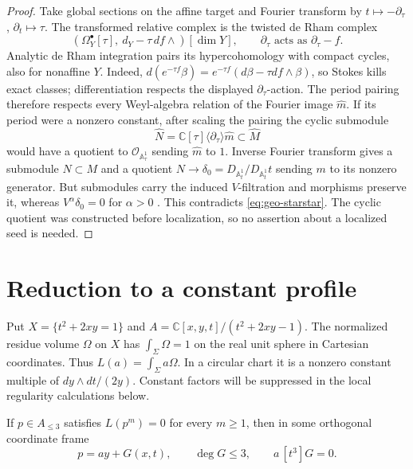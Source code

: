 \begin{proof}
Take global sections on the affine target and Fourier transform by
\(t\mapsto-\partial_\tau\), \(\partial_t\mapsto\tau\).
The transformed relative complex is the twisted de Rham complex
\[
 (\Omega_Y^\bullet[\tau],\ d_Y-\tau\,df\wedge)[\dim Y],
 \qquad \partial_\tau\text{ acts as }\partial_\tau-f.
\]
Analytic de Rham integration pairs its hypercohomology with compact
cycles, also for nonaffine \(Y\). Indeed,
\(d(e^{-\tau f}\beta)=e^{-\tau f}(d\beta-\tau df\wedge\beta)\),
so Stokes kills exact classes; differentiation respects the displayed
\(\partial_\tau\)-action. The period pairing therefore respects every
Weyl-algebra relation of the Fourier image \(\widehat m\).
If its period were a nonzero constant, after scaling the pairing the
cyclic submodule
\[
 \widehat N=\mathbb C[\tau]\langle\partial_\tau\rangle\widehat m
 \subset\widehat M
\]
would have a quotient to \(\mathcal O_{\mathbb A^1_\tau}\) sending
\(\widehat m\) to \(1\).
Inverse Fourier transform gives a submodule \(N\subset M\) and a
quotient \(N\to\delta_0=D_{\mathbb A^1_t}/D_{\mathbb A^1_t}t\)
sending \(m\) to its nonzero generator.
But submodules carry the induced \(V\)-filtration and morphisms
preserve it, whereas \(V^\alpha\delta_0=0\) for \(\alpha>0\)
\cite[Proposition~3.19(ii), Corollary~3.20, Example~3.18]{CDM24}.
This contradicts \eqref{eq:geo-starstar}. The cyclic quotient was constructed before
localization, so no assertion about a localized seed is needed.
\end{proof}

\section{Reduction to a constant profile}\label{sec:constant-profile}

Put \(X=\{t^2+2xy=1\}\) and \(A=\mathbb C[x,y,t]/(t^2+2xy-1)\).
The normalized residue volume \(\Omega\) on \(X\) has
\(\int_\Sigma\Omega=1\) on the real unit sphere in Cartesian
coordinates. Thus \(L(a)=\int_\Sigma a\Omega\).
In a circular chart it is a nonzero constant multiple of
\(dy\wedge dt/(2y)\). Constant factors will be suppressed in the
local regularity calculations below.

\begin{proposition}\label{prop:constant-profile}
If \(p\in A_{\leq3}\) satisfies \(L(p^m)=0\) for every \(m\geq1\),
then in some orthogonal coordinate frame
\[
 p=ay+G(x,t),\qquad \deg G\leq3,\qquad a\,[t^3]G=0.
\]
\end{proposition}

